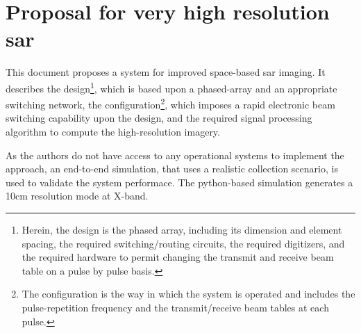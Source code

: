 \section{Proposal for very high resolution \gls{sar}}
This document proposes a system for improved space-based \gls{sar} imaging. It describes the design\footnote{Herein, the design is the phased array, including its dimension and element spacing, the required switching/routing circuits, the required digitizers, and the required hardware to permit changing the transmit and receive beam table on a pulse by pulse basis.}, which is based upon a phased-array and an appropriate switching network, the configuration\footnote{The configuration is the way in which the system is operated and includes the pulse-repetition frequency and the transmit/receive beam tables at each pulse.}, which imposes a rapid electronic beam switching capability upon the design, and the required signal processing algorithm to compute the high-resolution imagery.
\par
As the authors do not have access to any operational systems to implement the approach, an end-to-end simulation, that uses a realistic collection scenario, is used to validate the system performace. The python-based simulation generates a 10cm resolution mode at X-band. 

